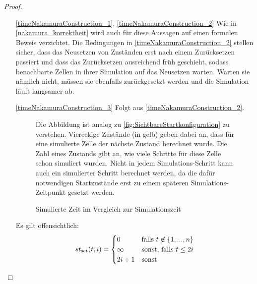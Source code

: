\begin{proof}
    \begin{itemize}
        \item[\ref{timeNakamuraConstruction_1},] %
         \ref{timeNakamuraConstruction_2}
            Wie in \cref{nakamura_korrektheit} wird auch für diese Aussagen
            auf einen formalen Beweis verzichtet.
            Die Bedingungen in \ref{timeNakamuraConstruction_2} stellen sicher,
            dass das Neusetzen von Zuständen erst nach einem Zurücksetzen passiert
            und dass das Zurücksetzen ausreichend früh geschieht, sodass benachbarte Zellen
            in ihrer Simulation auf das Neusetzen warten.
            Warten sie nämlich nicht, müssen sie ebenfalls zurückgesetzt werden und die Simulation läuft langsamer ab.
            
        \item[\ref{timeNakamuraConstruction_3}] Folgt aus \ref{timeNakamuraConstruction_2}.

            \newcommand{\nreset}{\scriptsize $\mathrm{reset}$}
            \newcommand{\setq}{\scriptsize $\mathrm{set}$}
            \begin{figure}[h!]
                \begin{center}
                
                \end{center}
                \caption{Simulierte Zeit im Vergleich zur Simulationszeit}
                \label{fig:NakamuraZeit}
                Die Abbildung ist analog zu \cref{fig:SichtbareStartkonfiguration} zu verstehen.
                Viereckige Zustände (in gelb) geben dabei an,
                dass für eine simulierte Zelle der nächste Zustand berechnet wurde.
                Die Zahl eines Zustands gibt an, wie viele Schritte für diese Zelle schon simuliert wurden.
                Nicht in jedem Simulations-Schritt kann auch ein simulierter Schritt berechnet werden,
                da die dafür notwendigen Startzustände erst zu einem späteren Simulations-Zeitpunkt gesetzt werden.
            \end{figure}
    
            Es gilt offensichtlich: 
            \[
                st_\mathrm{set}(t, i) =
                    \begin{cases}
                        0 & \text{falls } t \not\in \{ {1, ..., n} \} \\
                        \infty & \text{sonst, falls } t \leq 2i \\
                        2i + 1 & \text{sonst}
                    \end{cases}
            \]
            

\end{itemize}
\end{proof}
